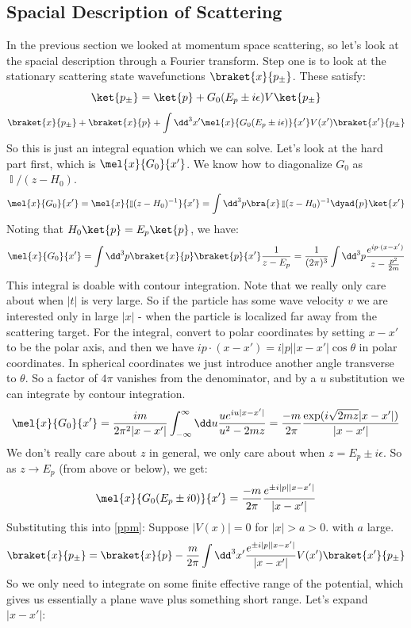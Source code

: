 \documentclass{article}
\DeclareMathOperator{\II}{\mathbb{I}}
\begin{document}
\subsection{Spacial Description of Scattering}
In the previous section we looked at momentum space scattering, so let's look at the spacial description through a Fourier transform. Step one is to look at the stationary scattering state wavefunctions $\braket{x}{p_\pm}$. These satisfy:
\[\ket{p_\pm} = \ket{p}+G_0(E_p\pm i \epsilon) V\ket{p_\pm}\]
\begin{equation}\label{ppm}\braket{x}{p_\pm} + \braket{x}{p} + \int \dd^3 x' \mel{x}{G_0(E_p\pm i\epsilon)}{x'}V(x')\braket{x'}{p_\pm}\end{equation}
So this is just an integral equation which we can solve. Let's look at the hard part first, which is $\mel{x}{G_0}{x'}$. We know how to diagonalize $G_0$ as $\II/(z-H_0)$. 
\[\mel{x}{G_0}{x'}=\mel{x}{\II(z-H_0)^{-1}}{x'}=\int \dd^3 p \bra{x}\II(z-H_0)^{-1} \dyad{p}\ket{x'}\]
Noting that $H_0\ket{p}=E_p\ket{p}$, we have:
\[\mel{x}{G_0}{x'} = \int \dd^3 p \braket{x}{p}\braket{p}{x'} \frac{1}{z-E_p} = \frac{1}{(2\pi)^3}\int \dd^3 p \frac{e^{ip\cdot(x-x')}}{z-\frac{p^2}{2m}}\]
This integral is doable with contour integration. Note that we really only care about when $|t|$ is very large. So if the particle has some wave velocity $v$ we are interested only in large $|x|$ - when the particle is localized far away from the scattering target. For the integral, convert to polar coordinates by setting $x-x'$ to be the polar axis, and then we have $ip\cdot(x-x') = i|p| |x-x'|\cos\theta$ in polar coordinates. In spherical coordinates we just introduce another angle transverse to $\theta$. So a factor of $4\pi$ vanishes from the denominator, and by a $u$ substitution we can integrate by contour integration.
\[\mel{x}{G_0}{x'}=\frac{im}{2\pi^2 |x-x'|}\int_{-\infty}^\infty \dd u \frac{u e^{iu|x-x'|}}{u^2-2mz} = \frac{-m}{2\pi} \frac{\exp(i\sqrt{2mz} |x-x'|)}{|x-x'|}\]
We don't really care about $z$ in general, we only care about when $z = E_p\pm i\epsilon$. So as $z \to E_p$ (from above or below), we get:
\begin{equation}\mel{x}{G_0(E_p\pm i0)}{x'}= \frac{-m}{2\pi}\frac{e^{\pm i |p||x-x'|}}{|x-x'|} \end{equation}
Substituting this into \eqref{ppm}: Suppose $|V(x)| = 0$ for $|x|>a>0$. with $a$ large.
\[\braket{x}{p_\pm}=\braket{x}{p} - \frac{m}{2\pi}\int \dd^3 x' \frac{e^{\pm i|p||x-x'|}}{|x-x'|} V(x') \braket{x'}{p_\pm}\]
So we only need to integrate on some finite effective range of the potential, which gives us essentially a plane wave plus something short range. Let's expand $|x-x'|$:
\end{document}
